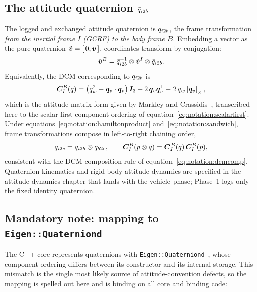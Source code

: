 \subsection{The attitude quaternion \texorpdfstring{$\bar{q}_{i2b}$}{q\_i2b}}

The logged and exchanged attitude quaternion is $\bar{q}_{i2b}$, the frame
transformation \emph{from the inertial frame $I$ (GCRF) to the body frame
$B$}. Embedding a vector as the pure quaternion
$\tilde{\bm{v}} = [\,0, \bm{v}\,]$, coordinates transform by conjugation:
\begin{equation}
  \tilde{\bm{v}}^{B}
    = \bar{q}_{i2b}^{-1} \otimes \tilde{\bm{v}}^{I} \otimes \bar{q}_{i2b}.
  \label{eq:notation:sandwich}
\end{equation}
Equivalently, the DCM corresponding to $\bar{q}_{i2b}$ is
\begin{equation}
  \bm{C}_{I}^{B}(\bar{q})
    = \bigl(q_w^2 - \bm{q}_v \cdot \bm{q}_v\bigr)\,\bm{I}_3
      + 2\,\bm{q}_v \bm{q}_v^{\mathsf T}
      - 2\,q_w \left[\bm{q}_v\right]_{\times},
  \label{eq:notation:quat2dcm}
\end{equation}
which is the attitude-matrix form given by Markley and
Crassidis~\cite{markley2014}, transcribed here to the scalar-first component
ordering of equation~\eqref{eq:notation:scalarfirst}. Under
equations~\eqref{eq:notation:hamiltonproduct}
and~\eqref{eq:notation:sandwich}, frame transformations compose in
left-to-right chaining order,
\begin{equation}
  \bar{q}_{i2c} = \bar{q}_{i2b} \otimes \bar{q}_{b2c},
  \qquad
  \bm{C}_{I}^{B}(\bar{p} \otimes \bar{q})
    = \bm{C}_{I}^{B}(\bar{q})\,\bm{C}_{I}^{B}(\bar{p}),
  \label{eq:notation:quatcomp}
\end{equation}
consistent with the DCM composition rule of
equation~\eqref{eq:notation:dcmcomp}. Quaternion kinematics and rigid-body
attitude dynamics are specified in the attitude-dynamics chapter that lands
with the vehicle phase; Phase~1 logs only the fixed identity quaternion.

\subsection{Mandatory note: mapping to \texttt{Eigen::Quaterniond}}
\label{sec:notation:eigen}

The C++ core represents quaternions with
\texttt{Eigen::Quaterniond}~\cite{eigenweb}, whose component ordering differs
between its constructor and its internal storage. This mismatch is the single
most likely source of attitude-convention defects, so the mapping is spelled
out here and is binding on all core and binding code:

